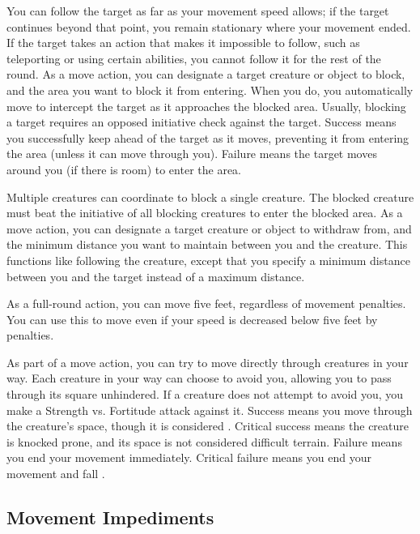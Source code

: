         You can follow the target as far as your movement speed allows; if the target continues beyond that point, you remain stationary where your movement ended. If the target takes an action that makes it impossible to follow, such as teleporting or using certain abilities, you cannot follow it for the rest of the round.
         As a move action, you can designate a target creature or object to block, and the area you want to block it from entering.
        When you do, you automatically move to intercept the target as it approaches the blocked area.
        Usually, blocking a target requires an opposed initiative check against the target.
        Success means you successfully keep ahead of the target as it moves, preventing it from entering the area (unless it can move through you).
        Failure means the target moves around you (if there is room) to enter the area.

        Multiple creatures can coordinate to block a single creature.
        The blocked creature must beat the initiative of all blocking creatures to enter the blocked area.
         As a move action, you can designate a target creature or object to withdraw from, and the minimum distance you want to maintain between you and the creature. This functions like following the creature, except that you specify a minimum distance between you and the target instead of a maximum distance.

         As a full-round action, you can move five feet, regardless of movement penalties. You can use this to move even if your speed is decreased below five feet by penalties.

        \label{Overrun} As part of a move action, you can try to move directly through creatures in your way.
        Each creature in your way can choose to avoid you, allowing you to pass through its square unhindered.
        If a creature does not attempt to avoid you, you make a Strength vs. Fortitude attack against it.
        Success means you move through the creature's space, though it is considered .
        Critical success means the creature is knocked prone, and its space is not considered difficult terrain.
        Failure means you end your movement immediately.
        Critical failure means you end your movement and fall \prone.

    \subsection{Movement Impediments}

